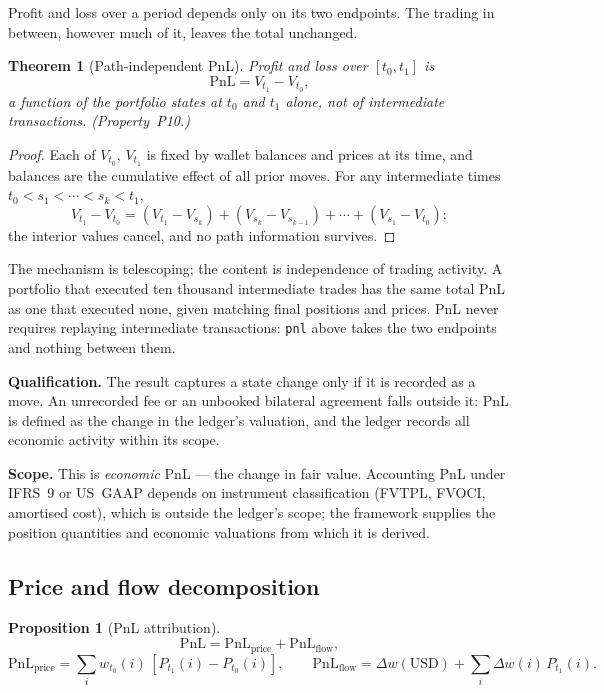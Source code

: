 \documentclass[11pt,a4paper]{article}
\newtheorem{theorem}[definition]{Theorem}
\newtheorem{proposition}[definition]{Proposition}
\begin{document}
\noindent Profit and loss over a period depends only on its two endpoints. The trading in between, however much of it, leaves the total unchanged.

\begin{theorem}[Path-independent PnL]
\label{inv:P10}
Profit and loss over $[t_0, t_1]$ is
\[
\mathrm{PnL} = V_{t_1} - V_{t_0},
\]
a function of the portfolio states at $t_0$ and $t_1$ alone, not of intermediate transactions. (Property~P10.)
\end{theorem}

\begin{proof}
Each of $V_{t_0}$, $V_{t_1}$ is fixed by wallet balances and prices at its time, and balances are the cumulative effect of all prior moves. For any intermediate times $t_0 < s_1 < \cdots < s_k < t_1$,
\[
V_{t_1} - V_{t_0} = (V_{t_1} - V_{s_k}) + (V_{s_k} - V_{s_{k-1}}) + \cdots + (V_{s_1} - V_{t_0});
\]
the interior values cancel, and no path information survives.
\end{proof}

\noindent The mechanism is telescoping; the content is independence of trading activity. A portfolio that executed ten thousand intermediate trades has the same total PnL as one that executed none, given matching final positions and prices. PnL never requires replaying intermediate transactions: \texttt{pnl} above takes the two endpoints and nothing between them.

\medskip
\noindent\textbf{Qualification.} The result captures a state change only if it is recorded as a move. An unrecorded fee or an unbooked bilateral agreement falls outside it: PnL is defined as the change in the ledger's valuation, and the ledger records all economic activity within its scope.

\medskip
\noindent\textbf{Scope.} This is \emph{economic} PnL --- the change in fair value. Accounting PnL under IFRS~9 or US~GAAP depends on instrument classification (FVTPL, FVOCI, amortised cost), which is outside the ledger's scope; the framework supplies the position quantities and economic valuations from which it is derived.

\subsection{Price and flow decomposition}

\begin{proposition}[PnL attribution]
\label{prop:pnl-attribution}
\[
\mathrm{PnL} = \mathrm{PnL}_{\text{price}} + \mathrm{PnL}_{\text{flow}},
\]
\[
\mathrm{PnL}_{\text{price}} = \sum_i w_{t_0}(i)\,[P_{t_1}(i) - P_{t_0}(i)],
\qquad
\mathrm{PnL}_{\text{flow}} = \Delta w(\mathrm{USD}) + \sum_i \Delta w(i)\,P_{t_1}(i).
\]
\end{proposition}
\end{document}
